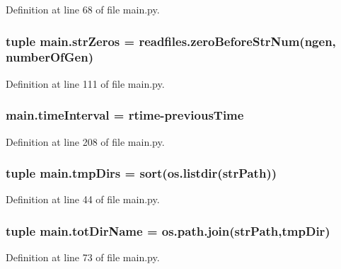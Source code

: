 Definition at line 68 of file main.\-py.

\hypertarget{a00122_a02d59015bebcf0ad1bc1162efca757c3}{
\subsubsection[{str\-Zeros}]{\setlength{\rightskip}{0pt plus 5cm}tuple main.\-str\-Zeros = readfiles.\-zero\-Before\-Str\-Num(ngen, {\bf number\-Of\-Gen})}}\label{a00122_a02d59015bebcf0ad1bc1162efca757c3}


Definition at line 111 of file main.\-py.

\hypertarget{a00122_a5ba0cd0b7538ed8047b2fea322ecb4b7}{
\subsubsection[{time\-Interval}]{\setlength{\rightskip}{0pt plus 5cm}main.\-time\-Interval = {\bf rtime}-\/{\bf previous\-Time}}}\label{a00122_a5ba0cd0b7538ed8047b2fea322ecb4b7}


Definition at line 208 of file main.\-py.

\hypertarget{a00122_a9606754176252315321d1faa6191479e}{
\subsubsection[{tmp\-Dirs}]{\setlength{\rightskip}{0pt plus 5cm}tuple main.\-tmp\-Dirs = sort(os.\-listdir({\bf str\-Path}))}}\label{a00122_a9606754176252315321d1faa6191479e}


Definition at line 44 of file main.\-py.

\hypertarget{a00122_a82f73a786e4c93e909fd689ee0d0812e}{
\subsubsection[{tot\-Dir\-Name}]{\setlength{\rightskip}{0pt plus 5cm}tuple main.\-tot\-Dir\-Name = os.\-path.\-join({\bf str\-Path},tmp\-Dir)}}\label{a00122_a82f73a786e4c93e909fd689ee0d0812e}


Definition at line 73 of file main.\-py.

